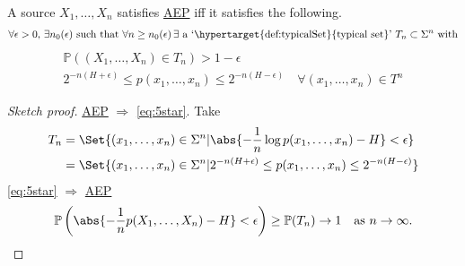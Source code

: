 \documentclass{article}
\newcommand{\Prob}{\mathbb{P}}
\newcommand{\1}[1]{\mathbbm{1}_{#1}}
\begin{document}
\begin{nlemma}\label{lem:1.8}
    A source $X_1, \dotsc, X_n$ satisfies \hyperlink{def:aep}{AEP} iff it satisfies the following.
    \begin{gather*}
        \forall \epsilon > 0, \, \exists n_0(\epsilon) \text{ such that } \forall n \geq n_0(\epsilon) \, \exists \text{ a `\hypertarget{def:typicalSet}{typical set}' } T_n \subset \Sigma^n \text{ with}
    \end{gather*}
    \begin{equation*}
        \begin{gathered}
        \Prob((X_1, \dotsc, X_n) \in T_n) > 1 - \epsilon \\
        2^{-n(H+\epsilon)} \leq p(x_1, \dotsc, x_n) \leq 2^{-n(H-\epsilon)}\quad \forall (x_1, \dotsc, x_n) \in T^n
        \end{gathered}
        \tag{$*$} \label{eq:5star}
    \end{equation*}
\end{nlemma}
\begin{proof}[Sketch proof]
    \hyperlink{def:aep}{AEP} $\Rightarrow$ \eqref{eq:5star}.
    Take
    \begin{align*}
        T_n &= \Set{(x_1, \dotsc, x_n) \in \Sigma^n | \abs{-\frac{1}{n} \log p(x_1, \dotsc, x_n) - H} < \epsilon} \\
            &= \Set{(x_1, \dotsc, x_n) \in \Sigma^n | 2^{-n(H+\epsilon)} \leq p(x_1, \dotsc, x_n) \leq 2^{-n(H-\epsilon)}} \\
    \end{align*}
    \eqref{eq:5star} $\Rightarrow$ \hyperlink{def:aep}{AEP}
    \begin{equation*}
        \Prob\left(\abs{- \frac{1}{n} p(X_1, \dotsc, X_n) - H} < \epsilon\right) \geq \Prob(T_n) \to 1 \quad \text{as } n \to \infty. \qedhere
    \end{equation*}
\end{proof}
\end{document}
